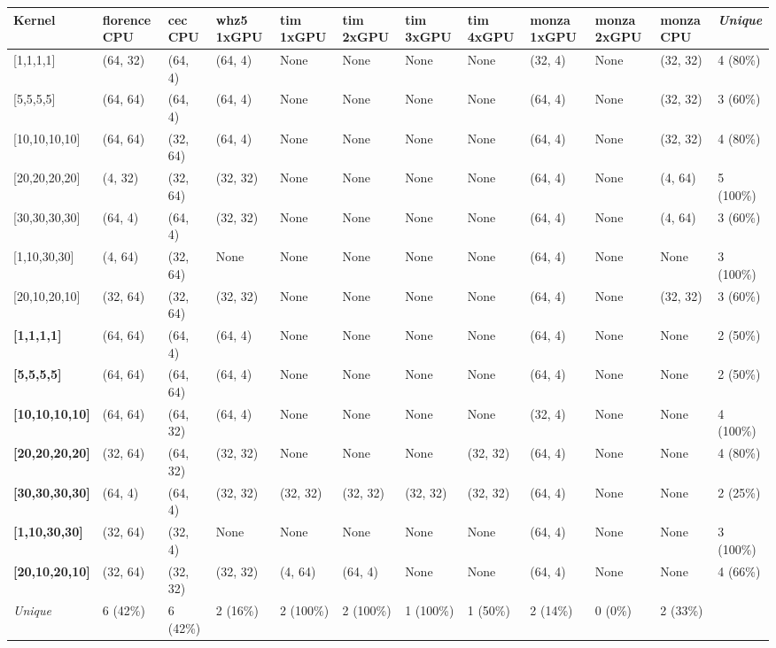 \begin{tabular}{|p{1.8cm} | p{1cm} | p{1cm} | p{1cm} | p{1cm} | p{1cm} | p{1cm} | p{1cm} | p{1cm} | p{1cm} | p{1cm} | p{1.1cm}|}
\hline
\textbf{Kernel} & \textbf{florence CPU} & \textbf{cec CPU} & \textbf{whz5 1xGPU} & \textbf{tim 1xGPU} & \textbf{tim 2xGPU} & \textbf{tim 3xGPU} & \textbf{tim 4xGPU} & \textbf{monza 1xGPU} & \textbf{monza 2xGPU} & \textbf{monza CPU} & \textit{Unique}\\
\hline
{[}1,1,1,1{]} & (64, 32) & (64, 4) & (64, 4) & None & None & None & None & (32, 4) & None & (32, 32) & 4 (80\%)\\
{[}5,5,5,5{]} & (64, 64) & (64, 4) & (64, 4) & None & None & None & None & (64, 4) & None & (32, 32) & 3 (60\%)\\
{[}10,10,10,10{]} & (64, 64) & (32, 64) & (64, 4) & None & None & None & None & (64, 4) & None & (32, 32) & 4 (80\%)\\
{[}20,20,20,20{]} & (4, 32) & (32, 64) & (32, 32) & None & None & None & None & (64, 4) & None & (4, 64) & 5 (100\%)\\
{[}30,30,30,30{]} & (64, 4) & (64, 4) & (32, 32) & None & None & None & None & (64, 4) & None & (4, 64) & 3 (60\%)\\
{[}1,10,30,30{]} & (4, 64) & (32, 64) & None & None & None & None & None & (64, 4) & None & None & 3 (100\%)\\
{[}20,10,20,10{]} & (32, 64) & (32, 64) & (32, 32) & None & None & None & None & (64, 4) & None & (32, 32) & 3 (60\%)\\
\textbf{{[}1,1,1,1{]}} & (64, 64) & (64, 4) & (64, 4) & None & None & None & None & (64, 4) & None & None & 2 (50\%)\\
\textbf{{[}5,5,5,5{]}} & (64, 64) & (64, 64) & (64, 4) & None & None & None & None & (64, 4) & None & None & 2 (50\%)\\
\textbf{{[}10,10,10,10{]}} & (64, 64) & (64, 32) & (64, 4) & None & None & None & None & (32, 4) & None & None & 4 (100\%)\\
\textbf{{[}20,20,20,20{]}} & (32, 64) & (64, 32) & (32, 32) & None & None & None & (32, 32) & (64, 4) & None & None & 4 (80\%)\\
\textbf{{[}30,30,30,30{]}} & (64, 4) & (64, 4) & (32, 32) & (32, 32) & (32, 32) & (32, 32) & (32, 32) & (64, 4) & None & None & 2 (25\%)\\
\textbf{{[}1,10,30,30{]}} & (32, 64) & (32, 4) & None & None & None & None & None & (64, 4) & None & None & 3 (100\%)\\
\textbf{{[}20,10,20,10{]}} & (32, 64) & (32, 32) & (32, 32) & (4, 64) & (64, 4) & None & None & (64, 4) & None & None & 4 (66\%)\\
\hline
\textit{Unique} & 6 (42\%) & 6 (42\%) & 2 (16\%) & 2 (100\%) & 2 (100\%) & 1 (100\%) & 1 (50\%) & 2 (14\%) & 0 (0\%) & 2 (33\%) & \\
\hline
\end{tabular}
